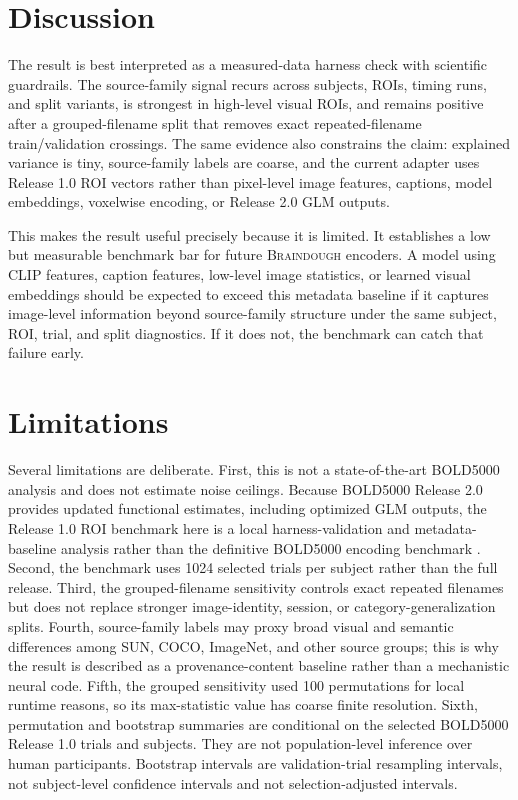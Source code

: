 \documentclass[11pt]{article}
\newcommand{\braindough}{\textsc{Braindough}}
\newcommand{\boldfive}{BOLD5000}
\begin{document}
\section{Discussion}

The result is best interpreted as a measured-data harness check with scientific
guardrails. The source-family signal recurs across subjects, ROIs, timing runs,
and split variants, is strongest in high-level visual ROIs, and remains positive
after a grouped-filename split that removes exact repeated-filename
train/validation crossings. The same evidence also constrains the claim:
explained variance is tiny, source-family labels are coarse, and the current
adapter uses Release 1.0 ROI vectors rather than pixel-level image features,
captions, model embeddings, voxelwise encoding, or Release 2.0 GLM outputs.

This makes the result useful precisely because it is limited. It establishes a
low but measurable benchmark bar for future \braindough{} encoders. A model
using CLIP features, caption features, low-level image statistics, or learned
visual embeddings should be expected to exceed this metadata baseline if it
captures image-level information beyond source-family structure under the same
subject, ROI, trial, and split diagnostics. If it does not, the benchmark can
catch that failure early.

\section{Limitations}

Several limitations are deliberate. First, this is not a state-of-the-art
\boldfive{} analysis and does not estimate noise ceilings. Because \boldfive{}
Release 2.0 provides updated functional estimates, including optimized GLM
outputs, the Release 1.0 ROI benchmark here is a local harness-validation and
metadata-baseline analysis rather than the definitive \boldfive{} encoding
benchmark \cite{bold5000repo}. Second, the benchmark uses 1024 selected trials per subject rather
than the full release. Third, the grouped-filename sensitivity controls exact
repeated filenames but does not replace stronger image-identity, session, or
category-generalization splits. Fourth, source-family labels may proxy broad
visual and semantic differences among SUN, COCO, ImageNet, and other source
groups; this is why the result is described as a provenance-content baseline
rather than a mechanistic neural code. Fifth, the grouped sensitivity used 100
permutations for local runtime reasons, so its max-statistic value has coarse
finite resolution. Sixth, permutation and bootstrap summaries are conditional
on the selected \boldfive{} Release 1.0 trials and subjects. They are not
population-level inference over human participants. Bootstrap intervals are
validation-trial resampling intervals, not subject-level confidence intervals
and not selection-adjusted intervals.
\end{document}

